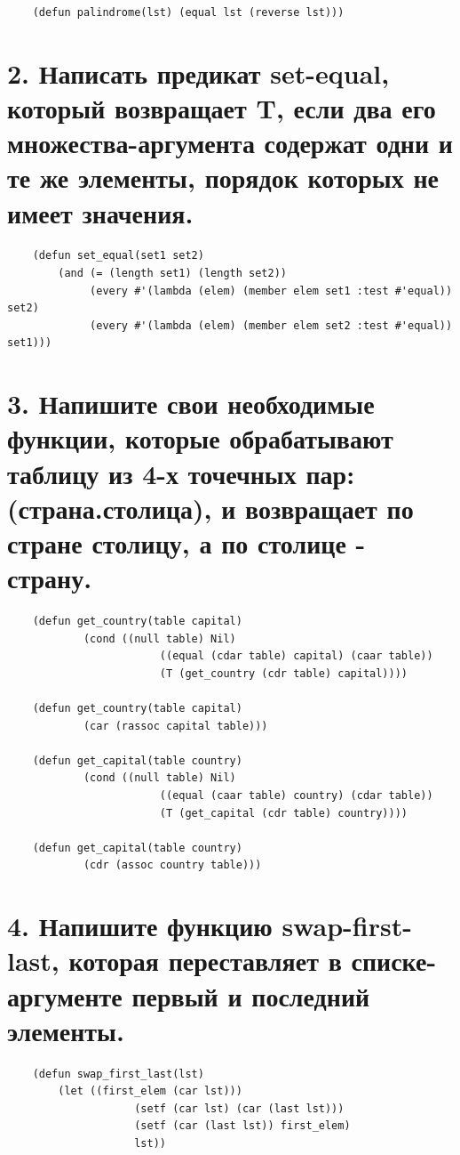 \documentclass[12pt]{report}
\begin{document}
\begin{lstlisting}
	(defun palindrome(lst) (equal lst (reverse lst)))
\end{lstlisting}

\section*{2. Написать предикат set-equal, который возвращает T, если два его множества-аргумента содержат одни и те же элементы, порядок которых не имеет значения.}

\begin{lstlisting}
	(defun set_equal(set1 set2)
		(and (= (length set1) (length set2))
			 (every #'(lambda (elem) (member elem set1 :test #'equal)) set2)
			 (every #'(lambda (elem) (member elem set2 :test #'equal)) set1)))
\end{lstlisting}

\section*{3. Напишите свои необходимые функции, которые обрабатывают таблицу из 4-х точечных пар: (страна.столица), и возвращает по стране столицу, а по столице - страну.}

\begin{lstlisting}
	(defun get_country(table capital)
			(cond ((null table) Nil)
						((equal (cdar table) capital) (caar table))
						(T (get_country (cdr table) capital))))
	
	(defun get_country(table capital)
			(car (rassoc capital table)))
	
	(defun get_capital(table country)
			(cond ((null table) Nil)
						((equal (caar table) country) (cdar table))
						(T (get_capital (cdr table) country))))
	
	(defun get_capital(table country)
			(cdr (assoc country table)))
\end{lstlisting}

\clearpage

\section*{4. Напишите функцию swap-first-last, которая переставляет в списке-аргументе первый и последний элементы.}

\begin{lstlisting}
	(defun swap_first_last(lst)
		(let ((first_elem (car lst))) 
					(setf (car lst) (car (last lst)))
					(setf (car (last lst)) first_elem)
					lst))
\end{lstlisting}
\end{document}
